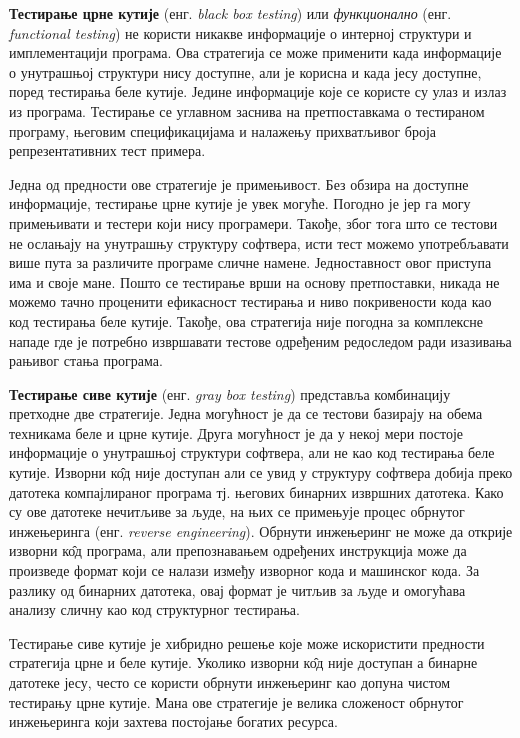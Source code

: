 \documentclass[12pt,oneside]{memoir}
\begin{document}
\begin{description}
\item \textbf{Тестирање црне кутије} (енг. \textit{black box testing}) или \textit{функционално} (енг. \textit{functional testing}) не користи никакве информације о интерној структури и имплементацији програма. Ова стратегија се може применити када информације о унутрашњој структури нису доступне, али је корисна и када јесу доступне, поред тестирања беле кутије. Једине информације које се користе су улаз и излаз из програма. Тестирање се углавном заснива на претпоставкама о тестираном програму, његовим спецификацијама и налажењу прихватљивог броја репрезентативних тест примера.
\par Једна од предности ове стратегије је примењивост. Без обзира на доступне информације, тестирање црне кутије је увек могуће. Погодно је јер га могу примењивати и тестери који нису програмери. Такође, због тога што се тестови не ослањају на унутрашњу структуру софтвера, исти тест можемо употребљавати више пута за различите програме сличне намене. Једноставност овог приступа има и своје мане. Пошто се тестирање врши на основу претпоставки, никада не можемо тачно проценити ефикасност тестирања и ниво покривености кода као код тестирања беле кутије. Такође, ова стратегија није погодна за комплексне нападе где је потребно извршавати тестове одређеним редоследом ради изазивања рањивог стања програма.

\item \textbf{Тестирање сиве кутије} (енг. \textit{gray box testing}) представља комбинацију претходне две стратегије. Једна могућност је да се тестови базирају на обема техникама беле и црне кутије. Друга могућност је да у некој мери постоје информације о унутрашњој структури софтвера, али не као код тестирања беле кутије. Изворни к\^{о}д није доступан али се увид у структуру софтвера добија преко датотека компајлираног програма тј. његових бинарних извршних датотека. Како су ове датотеке нечитљиве за људе, на њих се примењује процес обрнутог инжењеринга (енг. \textit{reverse engineering}). Обрнути инжењеринг не може да открије изворни к\^{о}д програма, али препознавањем одређених инструкција може да произведе формат који се налази између изворног кода и машинског кода. За разлику од бинарних датотека, овај формат је читљив за људе и омогућава анализу сличну као код структурног тестирања. 
\par Тестирање сиве кутије је хибридно решење које може искористити предности стратегија црне и беле кутије. Уколико изворни к\^{о}д није доступан а бинарне датотеке јесу, често се користи обрнути инжењеринг као допуна чистом тестирању црне кутије. Мана ове стратегије је велика сложеност обрнутог инжењеринга који захтева постојање богатих ресурса.
\end{description}
\end{document}
